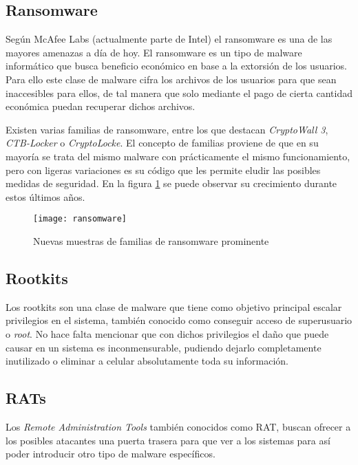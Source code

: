 \subsection{Ransomware}

Según McAfee Labs \cite{mcafee-predictions} (actualmente parte de Intel) el ransomware es una de las mayores amenazas a día de hoy. El ransomware es un tipo de malware informático que busca beneficio económico en base a la extorsión de los usuarios. Para ello este clase de malware cifra los archivos de los usuarios para que sean inaccesibles para ellos, de tal manera que solo mediante el pago de cierta cantidad económica puedan recuperar dichos archivos.

Existen varias familias de ransomware, entre los que destacan \emph{CryptoWall 3}, \emph{CTB-Locker} o \emph{CryptoLocke}. El concepto de familias proviene de que en su mayoría se trata del mismo malware con prácticamente el mismo funcionamiento, pero con ligeras variaciones es su código que les permite eludir las posibles medidas de seguridad. En la figura \ref{fig:ransomware} se puede observar su crecimiento durante estos últimos años.

\begin{figure}[H]
	\centering
	\texttt{[image: ransomware]}
	\caption{Nuevas muestras de familias de ransomware prominente \cite{mcafee-predictions}}
	\label{fig:ransomware}
\end{figure}

\subsection{Rootkits}

Los rootkits son una clase de malware que tiene como objetivo principal escalar privilegios en el sistema, también conocido como conseguir acceso de superusuario o \textit{root}. No hace falta mencionar que con dichos privilegios el daño que puede causar en un sistema es inconmensurable, pudiendo dejarlo completamente inutilizado o eliminar a celular absolutamente toda su información.

\subsection{RATs}

Los \textit{Remote Administration Tools} también conocidos como RAT, buscan ofrecer a los posibles atacantes una puerta trasera para que ver a los sistemas para así poder introducir otro tipo de malware específicos.

